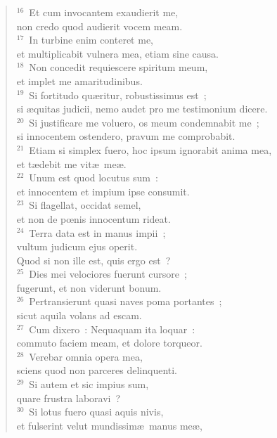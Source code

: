 \begin{flushleft}
\begin{verse}
${}^{16}$~Et cum invocantem exaudierit me,\\ non credo quod audierit vocem meam.\\
${}^{17}$~In turbine enim conteret me,\\ et multiplicabit vulnera mea, etiam sine causa.\\
${}^{18}$~Non concedit requiescere spiritum meum,\\ et implet me amaritudinibus.\\
${}^{19}$~Si fortitudo qu\ae ritur, robustissimus est~;\\ si \ae quitas judicii, nemo audet pro me testimonium dicere.\\
${}^{20}$~Si justificare me voluero, os meum condemnabit me~;\\ si innocentem ostendero, pravum me comprobabit.\\
${}^{21}$~Etiam si simplex fuero, hoc ipsum ignorabit anima mea,\\ et t\ae debit me vit\ae\ me\ae .\\
${}^{22}$~Unum est quod locutus sum~:\\ et innocentem et impium ipse consumit.\\
${}^{23}$~Si flagellat, occidat semel,\\ et non de pœnis innocentum rideat.\\
${}^{24}$~Terra data est in manus impii~;\\ vultum judicum ejus operit.\\ Quod si non ille est, quis ergo est~?\\
${}^{25}$~Dies mei velociores fuerunt cursore~;\\ fugerunt, et non viderunt bonum.\\
${}^{26}$~Pertransierunt quasi naves poma portantes~;\\ sicut aquila volans ad escam.\\
${}^{27}$~Cum dixero~: Nequaquam ita loquar~:\\ commuto faciem meam, et dolore torqueor.\\
${}^{28}$~Verebar omnia opera mea,\\ sciens quod non parceres delinquenti.\\
${}^{29}$~Si autem et sic impius sum,\\ quare frustra laboravi~?\\
${}^{30}$~Si lotus fuero quasi aquis nivis,\\ et fulserint velut mundissim\ae\ manus me\ae ,\\

\end{verse}
\end{flushleft}
